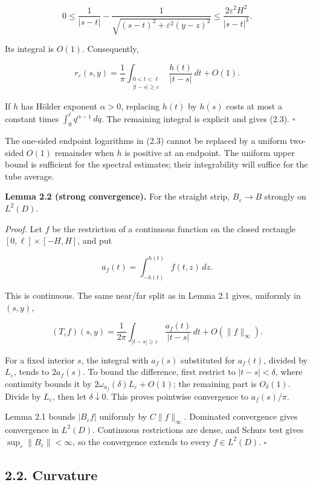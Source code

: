 \documentclass[11pt]{article}
\begin{document}
\[
0\le\frac1{|s-t|}-\frac1{\sqrt{(s-t)^2+\varepsilon^2(y-z)^2}}
 \le\frac{2\varepsilon^2 H^2}{|s-t|^3}.
\tag{2.4}
\]

Its integral is \(O(1)\). Consequently,

\[
r_\varepsilon(s,y)=\frac1\pi
 \int_{\substack{0<t<\ell\\|t-s|\ge\varepsilon}}
 \frac{h(t)}{|t-s|}\,dt+O(1).
\tag{2.5}
\]

If \(h\) has Hölder exponent \(\alpha>0\), replacing \(h(t)\) by
\(h(s)\) costs at most a constant times
\(\int_0^\ell q^{\alpha-1}\,dq\). The remaining integral is explicit and
gives (2.3). \(\square\)

The one-sided endpoint logarithms in (2.3) cannot be replaced by a
uniform two-sided \(O(1)\) remainder when \(h\) is positive at an
endpoint. The uniform upper bound is sufficient for the spectral
estimates; their integrability will suffice for the tube average.

\textbf{Lemma 2.2 (strong convergence).} For the straight strip,
\(B_\varepsilon\to B\) strongly on \(L^2(D)\).

\emph{Proof.} Let \(f\) be the restriction of a continuous function on
the closed rectangle \([0,\ell]\times[-H,H]\), and put

\[
a_f(t)=\int_{-h(t)}^{h(t)}f(t,z)\,dz.
\tag{2.6}
\]

This is continuous. The same near/far split as in Lemma 2.1 gives,
uniformly in \((s,y)\),

\[
(T_\varepsilon f)(s,y)=\frac1{2\pi}
 \int_{|t-s|\ge\varepsilon}\frac{a_f(t)}{|t-s|}\,dt
 +O(\|f\|_\infty).
\tag{2.7}
\]

For a fixed interior \(s\), the integral with \(a_f(s)\) substituted for
\(a_f(t)\), divided by \(L_\varepsilon\), tends to \(2a_f(s)\). To bound
the difference, first restrict to \(|t-s|<\delta\), where continuity
bounds it by \(2\omega_{a_f}(\delta)L_\varepsilon+O(1)\); the remaining
part is \(O_\delta(1)\). Divide by \(L_\varepsilon\), then let
\(\delta\downarrow0\). This proves pointwise convergence to
\(a_f(s)/\pi\).

Lemma 2.1 bounds \(|B_\varepsilon f|\) uniformly by \(C\|f\|_\infty\).
Dominated convergence gives convergence in \(L^2(D)\). Continuous
restrictions are dense, and Schur\textquotesingle s test gives
\(\sup_\varepsilon\|B_\varepsilon\|<\infty\), so the convergence extends
to every \(f\in L^2(D)\). \(\square\)

\subsection{2.2. Curvature}\label{curvature}
\end{document}
